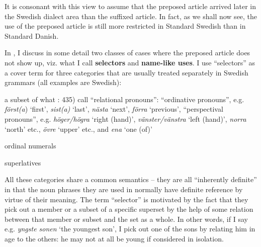 \begin{styleBodytextC}
It is consonant with this view to assume that the preposed article arrived later in the Swedish dialect area than the suffixed article. In fact, as we shall now see, the use of the preposed article is still more restricted in Standard Swedish than in Standard Danish. 

\end{styleBodytextC}

\begin{styleBodytextC}
In \citet{Dahl2003}, I discuss in some detail two classes of cases where the preposed article does not show up, viz. what I call \textbf{selectors} and \textbf{name-like uses}. I use “selectors” as a cover term for three categories that are usually treated separately in Swedish grammars (all examples are Swedish):

\end{styleBodytextC}


\begin{listWWNumiileveli}
\item {}

\begin{styleMyNumberedList}
a subset of what \citet{TelemanEtAl1999}: 435) call “relational pronouns”: “ordinative pronouns”, e.g. \textit{först(a}) ‘first’, \textit{sist(a)} ‘last’, \textit{nästa} ‘next’, \textit{förra }‘previous’, “perspectival pronouns”, e.g. \textit{höger/högra }‘right (hand)’, \textit{vänster/vänstra} ‘left (hand)’, \textit{norra} ‘north’ etc., \textit{övre} ‘upper’ etc., and \textit{ena} ‘one (of)’ 

\end{styleMyNumberedList}

\item {}

\begin{styleMyNumberedList}
ordinal numerals

\end{styleMyNumberedList}

\item {}

\begin{styleMyNumberedList}
superlatives

\end{styleMyNumberedList}

\end{listWWNumiileveli}

\begin{styleBodyTextFirst}
All these categories share a common semantics – they are all “inherently definite” in that the noun phrases they are used in normally have definite reference by virtue of their meaning. The term “selector” is motivated by the fact that they pick out a member or a subset of a specific superset by the help of some relation between that member or subset and the set as a whole. In other words, if I say e.g. \textit{yngste sonen} ‘the youngest son’, I pick out one of the sons by relating him in age to the others: he may not at all be young if considered in isolation. 

\end{styleBodyTextFirst}

